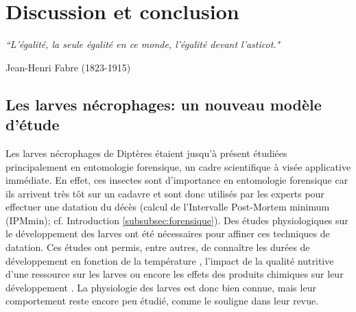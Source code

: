 \setcounter{chapter}{6}
\chapter*{Discussion et conclusion} %
\label{Discussion} %


\textit{``L'égalité, la seule égalité en ce monde, l'égalité devant l'asticot."}

\begin{flushright}
Jean-Henri Fabre (1823-1915)
\end{flushright}

\cleardoublepage

    
	\section{Les larves nécrophages: un nouveau modèle d'étude}  
    
Les larves nécrophages de Diptères étaient jusqu'à présent étudiées principalement en entomologie forensique, un cadre scientifique à visée applicative immédiate. En effet, ces insectes sont d'importance en entomologie forensique car ils arrivent très tôt sur un cadavre et sont donc utilisés par les experts pour effectuer une datation du décès (calcul de l'Intervalle Post-Mortem minimum (IPMmin); cf. Introduction \ref{subsubsec:forensique}). Des études physiologiques sur le développement des larves ont été nécessaires pour affiner ces techniques de datation. Ces études ont permis, entre autres, de connaître les durées de développement en fonction de la température \cite{grassberger_effect_2001}, l'impact de la qualité nutritive d'une ressource sur les larves \cite{ireland_effects_2006} ou encore les effets des produits chimiques sur leur développement \cite{aubernon_experimental_2015}. La physiologie des larves est donc bien connue, mais leur comportement reste encore peu étudié, comme le souligne \citet{rivers_physiological_2011} dans leur revue.


